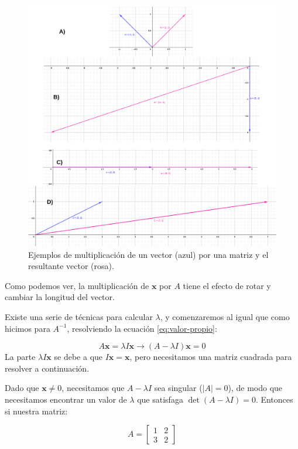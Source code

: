 \documentclass[
]{book}
\begin{document}
\begin{figure}

{\centering \includegraphics{Unidad-II/Eig-ejemplos} 

}

\caption{Ejemplos de multiplicación de un vector (azul) por una matriz y el resultante vector (rosa).}\label{fig:vector-mat}
\end{figure}

Como podemos ver, la multiplicación de \(\mathbf{x}\) por \(A\) tiene el efecto de rotar y cambiar la longitud del vector.

Existe una serie de técnicas para calcular \(\lambda\), y comenzaremos al igual que como hicimos para \(A^{-1}\), resolviendo la ecuación \eqref{eq:valor-propio}:

\[A \mathbf{x} = \lambda I \mathbf{x} \rightarrow (A - \lambda I) \mathbf{x} = 0\]
La parte \(\lambda I \mathbf{x}\) se debe a que \(I \mathbf{x} = \mathbf{x}\), pero necesitamos una matriz cuadrada para resolver a continuación.

Dado que \(\mathbf{x} \neq 0\), necesitamos que \(A - \lambda I\) sea singular (\(|A| = 0\)), de modo que necesitamos encontrar un valor de \(\lambda\) que satisfaga \(\det (A - \lambda I) = 0\). Entonces si nuestra matriz:

\[A = \left[
\begin{array}{cc}
1 & 2 \\
3 & 2
\end{array}
\right]\]
\end{document}
